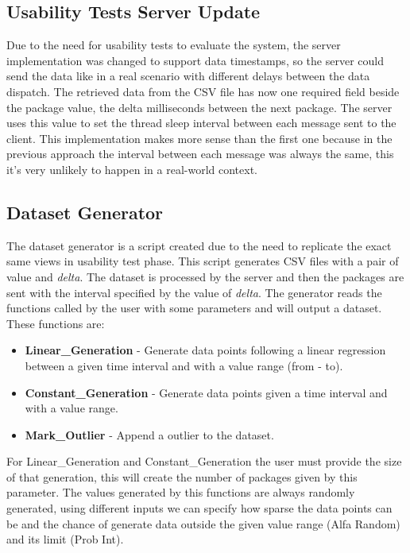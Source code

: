 \documentclass[letterpaper, 10 pt, conference]{ieeeconf}  %
\begin{document}
\subsection{Usability Tests Server Update}
\label{subsection:usabilityTests}
Due to the need for usability tests to evaluate the system, the server implementation was changed to support data timestamps, so the server could send the data like in a real scenario with different delays between the data dispatch. The retrieved data from the CSV file has now one required field beside the package value, the delta milliseconds between the next package. The server uses this value to set the thread sleep interval between each message sent to the client. This implementation makes more sense than the first one because in the previous approach the interval between each message was always the same, this it's very unlikely to happen in a real-world context.

\subsection{Dataset Generator}
\label{subsection:datasetGenerator}
The dataset generator is a script created due to the need to replicate the exact same views in usability test phase. This script generates CSV files with a pair of value and \textit{delta}. The dataset is processed by the server and then the packages are sent with the interval specified by the value of \textit{delta}. The generator reads the functions called by the user with some parameters and will output a dataset. These functions are:
\begin{itemize}
    \item \textbf{Linear\_Generation} - Generate data points following a linear regression between a given time interval and with a value range (from - to).
    \item \textbf{Constant\_Generation} - Generate data points given a time interval and with a value range.
    \item \textbf{Mark\_Outlier} - Append a outlier to the dataset.
\end{itemize}
For Linear\_Generation and Constant\_Generation the user must provide the size of that generation, this will create the number of packages given by this parameter.\newline 
The values generated by this functions are always randomly generated, using different inputs we can specify how sparse the data points can be and the chance of generate data outside the given value range (Alfa Random) and its limit (Prob Int).
\end{document}
